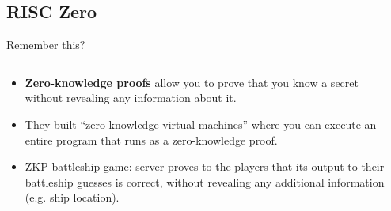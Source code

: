 \documentclass[aspectratio=169, lualatex, handout]{beamer}
\begin{document}
\subsection{RISC Zero}

\begin{frame}{Remember this?}
	\begin{columns}[c]
		\begin{column}{0.6\textwidth}
			\begin{itemize}[<+->]
				\item \textbf{Zero-knowledge proofs} allow you to prove that you know
				      a secret without revealing any information about it.
				\item They built ``zero-knowledge virtual machines'' where you can execute
				      an entire program that runs as a zero-knowledge proof.
				\item ZKP battleship game: server proves to the players that its
				      output to their battleship guesses is correct, without revealing any
				      additional information (e.g. ship location).
			\end{itemize}
		\end{column}
		\begin{column}{0.4\textwidth}
		\end{column}
	\end{columns}
\end{frame}
\end{document}
